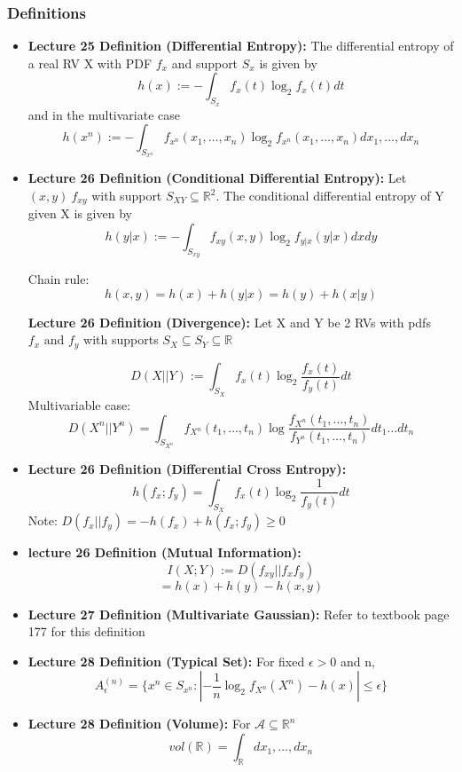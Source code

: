 \documentclass{article}
\begin{document}
\subsubsection{Definitions}
\begin{itemize}
    \item \textbf{Lecture 25 Definition (Differential Entropy):}
    The differential entropy of a real RV X with PDF \(f_x\) and support \(S_x\) is given by
    \[h(x) := -\int_{S_x}f_x(t)\log_2 f_x(t)dt\]
    and in the multivariate case
    \[h(x^n):=-\int_{S_{x^n}}f_{x^n}(x_1, \ldots, x_n)\log_2 f_{x^n}(x_1, \ldots, x_n)dx_1, \ldots, dx_n\]
    \item \textbf{Lecture 26 Definition (Conditional Differential Entropy):}
    Let \((x,y)~f_{xy}\) with support \(S_{XY} \subseteq \mathbb{R}^2\). The conditional differential entropy of Y given X is given by 
    \[h(y|x) := -\int_{S_{xy}} f_{xy}(x,y) \log_2 f_{y|x}(y|x) dx dy\]

    Chain rule:
    \[h(x,y) = h(x) + h(y|x) = h(y) + h(x|y)\]

    \textbf{Lecture 26 Definition (Divergence):}
    Let X and Y be 2 RVs with pdfs \(f_x \text{ and } f_y\) with supports \(S_X \subseteq S_Y \subseteq \mathbb{R}\)

    \[D(X||Y):= \int_{S_X} f_x(t) \log_2 \frac{f_x(t)}{f_y(t)} dt\]
    Multivariable case:
    \[D(X^n||Y^n) = \int_{S_{X^n}} f_{X^n}(t_1, \ldots, t_n) \log \frac{f_{X^n}(t_1, \ldots, t_n)}{f_{Y^n}(t_1, \ldots, t_n)}dt_1 \ldots dt_n\]

    \item \textbf{Lecture 26 Definition (Differential Cross Entropy):}
    \[h(f_x;f_y) = \int_{S_X} f_x(t) \log_2 \frac{1}{f_y(t)}dt\]
    Note: \(D(f_x||f_y) = -h(f_x) + h(f_x;f_y) \geq 0\)

    \item \textbf{lecture 26 Definition (Mutual Information):}
    \[I(X;Y):= D(f_{xy}||f_x f_y)\]
    \[= h(x) + h(y) - h(x,y)\]

    \item \textbf{Lecture 27 Definition (Multivariate Gaussian):}
    Refer to textbook page 177 for this definition

    \item \textbf{Lecture 28 Definition (Typical Set):}
    For fixed \(\epsilon > 0\) and n,
    \[A_{\epsilon}^{(n)} = \{x^n \in S_{x^n}: |-\frac{1}{n} \log_2 f_{X^n}(X^n) - h(x)| \leq \epsilon\}\]
    \item \textbf{Lecture 28 Definition (Volume):}
    For \(\mathcal{A} \subseteq \mathbb{R}^n\)
    \[vol(\mathbb{R}) = \int_{\mathbb{R}} dx_1, \ldots, dx_n\]
\end{itemize}
\end{document}
